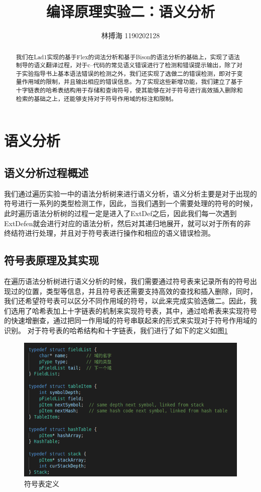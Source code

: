 \documentclass[lang=cn,11pt,a4paper,cite=authoryear]{elegantpaper}
\title{编译原理实验二：语义分析}
\author{林搏海 1190202128}
\institute{{哈尔滨工业大学} {物联网工程}}
\date{\zhtoday}
\begin{document}
\maketitle

\begin{abstract}
\hspace*{0.7cm}我们在Lad1实现的基于Flex的词法分析和基于Bison的语法分析的基础上，实现了语法制导的语义翻译过程，对于c--代码的常见语义错误进行了检测和错误提示输出，除了对于实验指导书上基本语法错误的检测之外，我们还实现了选做二的错误检测，即对于变量作用域的限制，并且输出相应的错误信息。为了实现这些新增功能，我们建立了基于十字链表的哈希表结构用于存储和查询符号，使其能够在对于符号进行高效插入删除和检索的基础之上，还能够支持对于符号作用域的标注和限制。
\end{abstract}



\section{语义分析}
\subsection{语义分析过程概述}
我们通过遍历实验一中的语法分析树来进行语义分析，语义分析主要是对于出现的符号进行一系列的类型检测工作，因此，当我们遇到一个需要处理的符号的时候，此时遍历语法分析树的过程一定是进入了ExtDef之后，因此我们每一次遇到ExtDefen就会进行对应的语法分析，然后对其递归地展开，就可以对于所有的非终结符进行处理，并且对于符号表进行操作和相应的语义错误检测。

\subsection{符号表原理及其实现}
在遍历语法分析树进行语义分析的时候，我们需要通过符号表来记录所有的符号出现过的位置，类型等信息，并且符号表还需要支持高效的查找和插入删除，同时，我们还希望符号表可以区分不同作用域的符号，以此来完成实验选做二。因此，我们选用了哈希表加上十字链表的机制来实现符号表，其中，通过哈希表来实现符号的快速增删查，通过把同一作用域的符号串联起来的形式来实现对于符号作用域的识别。
对于符号表的哈希结构和十字链表，我们进行了如下的定义如图\ref{pic1}
\begin{figure}[h]
	\centering
	\includegraphics[width=\textwidth]{pics//11.png}
	\caption{符号表定义}
	\label{pic1}
\end{figure}
\end{document}
